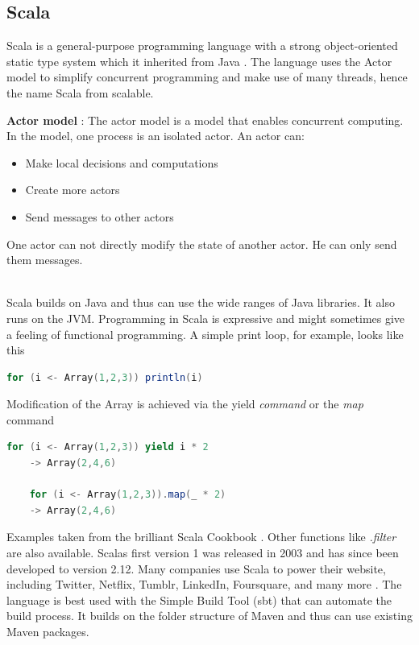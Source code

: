 \subsection{Scala}
Scala is a general-purpose programming language with a strong
object-oriented static type system which it inherited from Java
\cite{alexander_scala_cookbook}.
The language uses the Actor model to simplify concurrent
programming and make use of many threads, hence the name
Scala from scalable.
\begin{tcolorbox}[colback=SkyBlue, box align=top]
\textbf{Actor model} \cite{hewitt_actor_model}: The actor model is a model
that enables concurrent computing. In the model, one process
is an isolated actor. An actor can:
\begin{itemize}
    \item Make local decisions and computations
    \item Create more actors
    \item Send messages to other actors
\end{itemize}
One actor can not directly modify the state of another actor.
He can only send them messages.
\end{tcolorbox}
\mbox{}\\
Scala builds on Java and thus can use the wide ranges of Java libraries.
It also runs on the JVM.
Programming in Scala is expressive and might sometimes give a feeling
of functional programming.
A simple print loop, for example, looks like this
\begin{lstlisting}[language=scala, frame=single]
    for (i <- Array(1,2,3)) println(i)
\end{lstlisting}
Modification of the Array is achieved via the yield \textit{command}
or the \textit{map} command
\begin{lstlisting}[language=scala, frame=single]
    for (i <- Array(1,2,3)) yield i * 2
    -> Array(2,4,6)
    
    for (i <- Array(1,2,3)).map(_ * 2)
    -> Array(2,4,6)
\end{lstlisting}
Examples taken from the brilliant Scala Cookbook
\cite[p.~xiv-xv]{alexander_scala_cookbook}. \newline
Other functions like \textit{.filter} are also available.
Scalas first version 1 was released in 2003 and has since been
developed to version 2.12. Many companies use Scala to power
their website, including Twitter, Netflix, Tumblr, LinkedIn,
Foursquare, and many more \cite[p.~xiii]{alexander_scala_cookbook}.
The language is best used with the Simple Build Tool (sbt)
that can automate the build process. It builds on the folder
structure of Maven and thus can use existing Maven packages.

